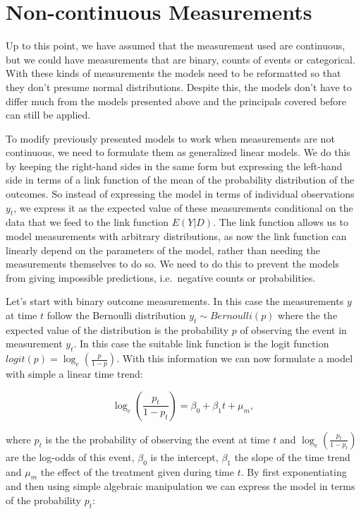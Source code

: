 \documentclass[12pt,a4paper,leqno]{report}
\theoremstyle{plain}
\theoremstyle{definition}
\theoremstyle{remark}
\begin{document}
\section{Non-continuous Measurements}\label{noncontinuous}

Up to this point, we have assumed that the measurement used are continuous, but
we could have measurements that are binary, counts of events or
categorical. With these kinds of measurements the models need to be reformatted so that
they don't presume normal distributions. Despite this, the models don't
have to differ much from the models presented above and the principals covered
before can still be applied.

To modify previously presented models to work when measurements are not
continuous, we need to formulate them as generalized linear models. We do
this by keeping the right-hand sides in the same form but expressing the
left-hand side in terms of a link function of the mean of the probability
distribution of the outcomes. So instead of expressing the model in terms of
individual observations \(y_t\), we express it as the expected value of these
measurements conditional on the data that we feed to the link
function \(E(Y|D)\). The link function allows us to model measurements with arbitrary
distributions, as now the link function can linearly depend on the parameters of
the model, rather than needing the measurements themselves to do so. We need to
do this to prevent the models from giving impossible predictions, i.e.\ negative
counts or probabilities.

Let's start with binary outcome measurements. In this case the
measurements \(y\) at time \(t\) follow the Bernoulli distribution \(y_t \sim
Bernoulli(p)\) where the the expected value of the distribution is the
probability \(p\) of observing the event in measurement \(y_t\). In this case
the suitable link function is the logit function
\(logit(p)=\log_e(\frac{p}{1-p})\). With this information we can now formulate a
model with simple a linear time trend:

\begin{def}\label{}
    \begin{equation}
        \log_e(\frac{p_t}{1-p_t})=\beta_0 + \beta_1 t + \mu_m,
    \end{equation}
\end{def}where \(p_t\) is the the probability of observing the event at time
\(t\) and \(\log_e(\frac{p_t}{1-p_t})\) are the log-odds of this event,
\(\beta_0\) is the intercept, \(\beta_1\) the slope of the time trend and
\(\mu_m\) the effect of the treatment given during time \(t\). By first
exponentiating and then using simple algebraic manipulation we can
express the model in terms of the probability \(p_t\):
\end{document}
